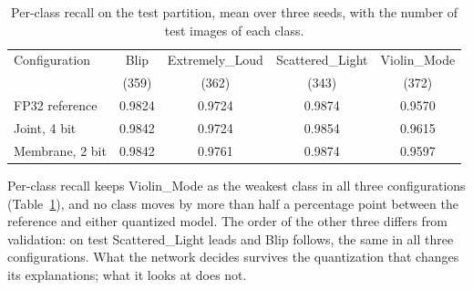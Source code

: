 \begin{table}[htbp]
\centering
\begin{tabular}{lcccc}
\toprule
Configuration & Blip & Extremely\_Loud & Scattered\_Light & Violin\_Mode \\
 & (359) & (362) & (343) & (372) \\
\midrule
FP32 reference  & 0.9824 & 0.9724 & 0.9874 & 0.9570 \\
Joint, 4 bit    & 0.9842 & 0.9724 & 0.9854 & 0.9615 \\
Membrane, 2 bit & 0.9842 & 0.9761 & 0.9874 & 0.9597 \\
\bottomrule
\end{tabular}
\caption{Per-class recall on the test partition, mean over three seeds, with the
number of test images of each class.}
\label{tab:test-recall}
\end{table}

Per-class recall keeps Violin\_Mode as the weakest class in all three
configurations (Table~\ref{tab:test-recall}), and no class moves by more than
half a percentage point between the reference and either quantized model. The
order of the other three differs from validation: on test Scattered\_Light leads
and Blip follows, the same in all three configurations. What the network decides
survives the quantization that changes its explanations; what it looks at does
not.
